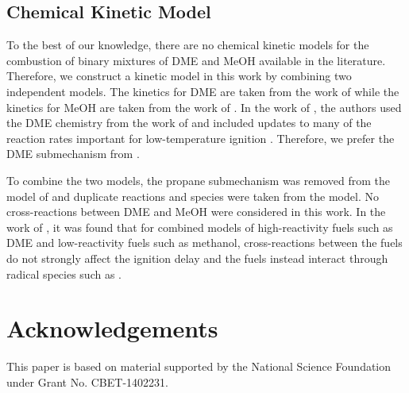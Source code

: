 \documentclass[12pt]{../ussci}
\begin{document}
\subsection{Chemical Kinetic Model}\label{sec:chemical-kinetic-model}

To the best of our knowledge, there are no chemical kinetic models for the
combustion of binary mixtures of DME and MeOH available in the literature.
Therefore, we construct a kinetic model in this work by combining two
independent models. The kinetics for DME are taken from the work of
\textcite{Dames2016} while the kinetics for MeOH are taken from the work of
\textcite{Burke2016}. In the work of \textcite{Dames2016}, the authors used the
DME chemistry from the work of \textcite{Burke2015a} and included updates to
many of the reaction rates important for low-temperature ignition
\autocite{Dames2016}. Therefore, we prefer the DME submechanism from
\textcite{Dames2016}.

To combine the two models, the propane submechanism was removed from the model
of \textcite{Dames2016} and duplicate reactions and species were taken from the
\textcite{Dames2016} model. No cross-reactions between DME and MeOH were
considered in this work. In the work of \textcite{Dames2016}, it was found that
for combined models of high-reactivity fuels such as DME and low-reactivity
fuels such as methanol, cross-reactions between the fuels do not strongly affect
the ignition delay and the fuels instead interact through radical species such
as .

\section{Acknowledgements}\label{acknowledgements}

This paper is based on material supported by the National Science
Foundation under Grant No. CBET-1402231.

\printbibliography
\end{document}
